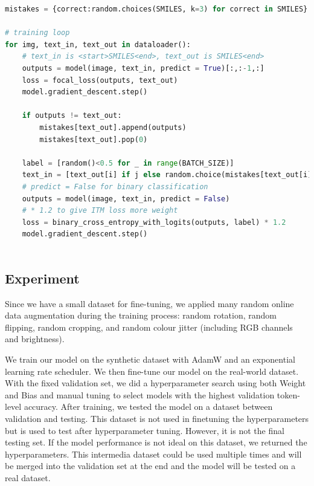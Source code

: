 \documentclass[12pt]{article}
\begin{document}
\begin{minipage}{\linewidth}

\begin{lstlisting}[language=Python, caption=Training Process Pseudocode, label=selfnagative]
mistakes = {correct:random.choices(SMILES, k=3) for correct in SMILES}

# training loop
for img, text_in, text_out in dataloader():
    # text_in is <start>SMILES<end>, text_out is SMILES<end>
    outputs = model(image, text_in, predict = True)[:,:-1,:]
    loss = focal_loss(outputs, text_out)
    model.gradient_descent.step()
    
    if outputs != text_out:
        mistakes[text_out].append(outputs)
        mistakes[text_out].pop(0)
    
    label = [random()<0.5 for _ in range(BATCH_SIZE)]
    text_in = [text_out[i] if j else random.choice(mistakes[text_out[i]]) for i, j in enumerate(label)]
    # predict = False for binary classification 
    outputs = model(image, text_in, predict = False)
    # * 1.2 to give ITM loss more weight
    loss = binary_cross_entropy_with_logits(outputs, label) * 1.2 
    model.gradient_descent.step()
    
\end{lstlisting}
\end{minipage}
\subsection{Experiment}

Since we have a small dataset for fine-tuning, we applied many random online data augmentation during the training process: random rotation, random flipping, random cropping,  and random colour jitter (including RGB channels and brightness). 

We train our model on the synthetic dataset with AdamW \autocite{adamw} and an exponential learning rate scheduler. We then fine-tune our model on the real-world dataset. With the fixed validation set, we did a hyperparameter search using both Weight and Bias \autocite{wandb} and manual tuning to select models with the highest validation token-level accuracy.  
After training, we tested the model on a dataset between validation and testing. This dataset is not used in finetuning the hyperparameters but is used to test after hyperparameter tuning. However, it is not the final testing set. If the model performance is not ideal on this dataset, we returned the hyperparameters. This intermedia dataset could be used multiple times and will be merged into the validation set at the end and the model will be tested on a real dataset.
\end{document}
